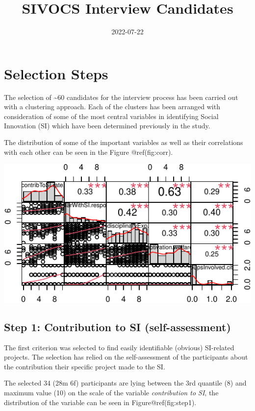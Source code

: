 \documentclass[]{tufte-book}
\title[Selection Criteria]{SIVOCS Interview Candidates}
\date{2022-07-22}
\begin{document}
\maketitle




\hypertarget{selection-steps}{%
\chapter{Selection Steps}\label{selection-steps}}

The selection of \textasciitilde60 candidates for the interview process
has been carried out with a clustering approach. Each of the clusters
has been arranged with consideration of some of the most central
variables in identifying Social Innovation (SI) which have been
determined previously in the study.

The distribution of some of the important variables as well as their
correlations with each other can be seen in the Figure @ref(fig:corr).

\includegraphics{03_SIVOCS_int-cand_files/figure-latex/corr-1}

\hypertarget{step-1-contribution-to-si-self-assessment}{%
\section{Step 1: Contribution to SI
(self-assessment)}\label{step-1-contribution-to-si-self-assessment}}

The first criterion was selected to find easily identifiable (obvious)
SI-related projects. The selection has relied on the self-assessment of
the participants about the contribution their specific project made to
the SI.

The selected 34 (28m \textbar{} 6f) participants are lying between the
3rd quantile (8) and maximum value (10) on the scale of the variable
\emph{contribution to SI}, the distribution of the variable can be seen
in Figure@ref(fig:step1).
\end{document}
